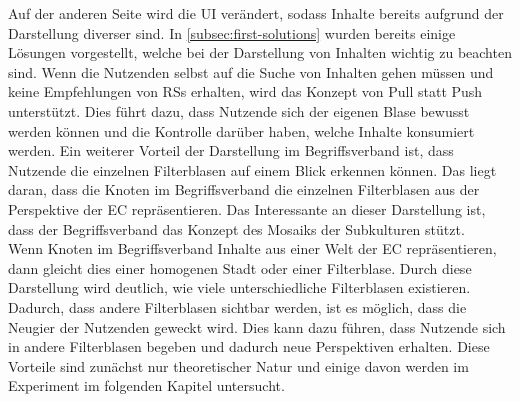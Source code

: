 Auf der anderen Seite wird die \ac{UI} verändert, sodass Inhalte bereits aufgrund der Darstellung diverser sind.
In \autoref{subsec:first-solutions} wurden bereits einige Lösungen vorgestellt, welche bei der Darstellung von Inhalten wichtig zu beachten sind.
Wenn die Nutzenden selbst auf die Suche von Inhalten gehen müssen und keine Empfehlungen von \acp{RS} erhalten, wird das Konzept von Pull statt Push unterstützt.
Dies führt dazu, dass Nutzende sich der eigenen Blase bewusst werden können und die Kontrolle darüber haben, welche Inhalte konsumiert werden.
Ein weiterer Vorteil der Darstellung im Begriffsverband ist, dass Nutzende die einzelnen Filterblasen auf einem Blick erkennen können.
Das liegt daran, dass die Knoten im Begriffsverband die einzelnen Filterblasen aus der Perspektive der \ac{EC} repräsentieren.
Das Interessante an dieser Darstellung ist, dass der Begriffsverband das Konzept des Mosaiks der Subkulturen stützt. \\

Wenn Knoten im Begriffsverband Inhalte aus einer Welt der \ac{EC} repräsentieren, dann gleicht dies einer homogenen Stadt oder einer Filterblase.
Durch diese Darstellung wird deutlich, wie viele unterschiedliche Filterblasen existieren.
Dadurch, dass andere Filterblasen sichtbar werden, ist es möglich, dass die Neugier der Nutzenden geweckt wird.
Dies kann dazu führen, dass Nutzende sich in andere Filterblasen begeben und dadurch neue Perspektiven erhalten.
Diese Vorteile sind zunächst nur theoretischer Natur und einige davon werden im Experiment im folgenden Kapitel untersucht.
